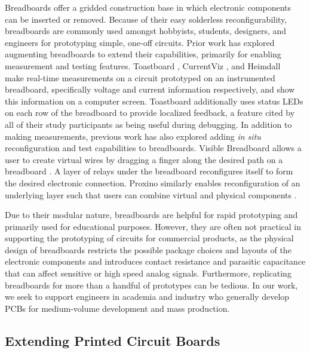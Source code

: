 \documentclass [11pt, proquest] {uwthesis}[2020/02/24]
\begin{document}
Breadboards offer a gridded construction base in which electronic components can be inserted or removed.
Because of their easy solderless reconfigurability, breadboards are commonly used amongst hobbyists, students, designers, and engineers for prototyping simple, one-off circuits.
Prior work has explored augmenting breadboards to extend their capabilities, primarily for enabling measurement and testing features.
Toastboard \cite{Drew2016TheToastboard},  CurrentViz \cite{Wu2017CurrentViz:Circuits}, and Heimdall~\cite{Karchemsky2019Heimdall:Projects} make real-time measurements on a circuit prototyped on an instrumented breadboard, specifically voltage and current information respectively, and show this information on a computer screen.
Toastboard additionally uses status LEDs on each row of the breadboard to provide localized feedback, a feature cited by all of their study participants as being useful during debugging.
In addition to making measurements, previous work has also explored adding \textit{in situ} reconfiguration and test capabilities to breadboards.
Visible Breadboard allows a user to create virtual wires by dragging a finger along the desired path on a breadboard \cite{Ochiai2014VisibleElectricity}.
A layer of relays under the breadboard reconfigures itself to form the desired electronic connection.
Proxino similarly enables reconfiguration of an underlying layer such that users can combine virtual and physical components \cite{Wu2019Proxino}.

Due to their modular nature, breadboards are helpful for rapid prototyping and primarily used for educational purposes.
However, they are often not practical in supporting the prototyping of circuits for commercial products, as the physical design of breadboards restricts the possible package choices and layouts of the electronic components and introduces contact resistance and parasitic capacitance that can affect sensitive or high speed analog signals.
Furthermore, replicating breadboards for more than a handful of prototypes can be tedious.
In our work, we seek to support engineers in academia and industry who generally develop PCBs for medium-volume development and mass production.

\subsection{Extending Printed Circuit Boards}
\end{document}
